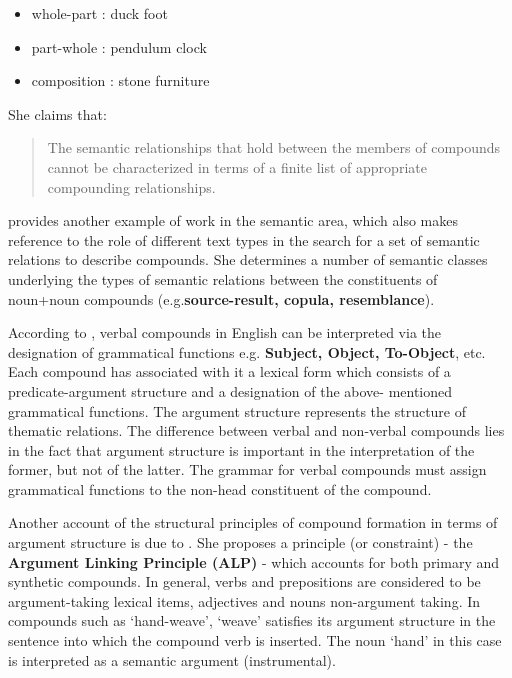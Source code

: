 \begin{itemize}
\item whole-part  : duck foot
\item part-whole  : pendulum clock
\item composition : stone furniture
\end{itemize}

\noindent
She claims that:

\begin{quotation}
The  semantic  relationships that hold between  the  members  of 
\mbox{compounds}  cannot  be characterized in terms of a finite list  of 
appropriate compounding relationships.
\end{quotation}

\noindent
\cite{Warren78} provides another example of work in  the  semantic 
area,  which  also makes reference to the role of different  text 
types  in the search for a set of semantic relations to  describe 
compounds.   She   determines  a  number  of  semantic   classes 
underlying   the   types  of  semantic  relations   between   the 
constituents of noun+noun compounds (e.g.{\bf source-result,  copula, 
resemblance}). 


According   to  \cite{Selkirk82},  verbal compounds in English  can  
be  interpreted  via  the designation of  grammatical   functions  
e.g.  {\bf Subject,   Object,   To-Object},  etc.  Each  compound  has 
associated  with  it   a  lexical  form  which  consists   of   a   
predicate-argument  structure  and  a designation of  the  above-
mentioned    grammatical  functions.    The   argument  structure 
represents the  structure  of thematic relations.  The difference 
between  verbal and non-verbal compounds  lies in the  fact  that 
argument  structure  is  important in the interpretation  of  the 
former,  but not of the latter.  The grammar for verbal compounds 
must  assign grammatical functions to the non-head constituent of 
the compound.

Another   account  of  the  structural  principles  of   compound 
formation   in  terms  of  argument structure is  due  to  \cite{Lieber83}.
She proposes a  principle (or constraint) - the {\bf Argument  
Linking  Principle (ALP)} - which  accounts  for  both primary and  
synthetic  compounds.   In general,   verbs  and prepositions are 
considered to be  argument-taking  lexical items,  adjectives and 
nouns  non-argument taking.  In compounds such  as  `hand-weave', 
`weave' satisfies its argument structure  in  the  sentence  into 
which   the  compound  verb  is inserted.   The  noun  `hand'  in 
this   case   is    interpreted    as    a   semantic    argument 
(instrumental).

